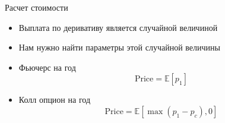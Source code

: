 \documentclass{beamer}
\newcommand{\E}{\ensuremath{\mathbb{E}}}
\begin{document}
        \begin{frame}{Расчет стоимости}
            \begin{itemize}
                \item Выплата по деривативу является случайной величиной
                \item Нам нужно найти параметры этой случайной величины
            \end{itemize}
            \begin{itemize}
                \item Фьючерс на год
                \[
                    \mathrm{Price} = \E \left[ p_1 \right]
                \]
                \item Колл опцион на год
                \[
                    \mathrm{Price} = \E \left[ \max{(p_1 - p_c), 0} \right]
                \]
            \end{itemize}
        \end{frame}


    
\end{document}
